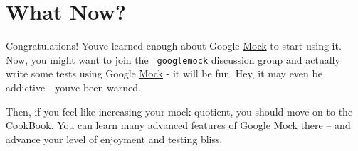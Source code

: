 \section*{What Now?}

Congratulations! You\textquotesingle{}ve learned enough about Google \mbox{\hyperlink{class_mock}{Mock}} to start using it. Now, you might want to join the \href{http://groups.google.com/group/googlemock}{\texttt{ googlemock}} discussion group and actually write some tests using Google \mbox{\hyperlink{class_mock}{Mock}} -\/ it will be fun. Hey, it may even be addictive -\/ you\textquotesingle{}ve been warned.

Then, if you feel like increasing your mock quotient, you should move on to the \mbox{\hyperlink{_obj__test_2lib_2googletest-release-1_88_81_2googlemock_2docs_2_cook_book_8md}{Cook\+Book}}. You can learn many advanced features of Google \mbox{\hyperlink{class_mock}{Mock}} there -- and advance your level of enjoyment and testing bliss. 